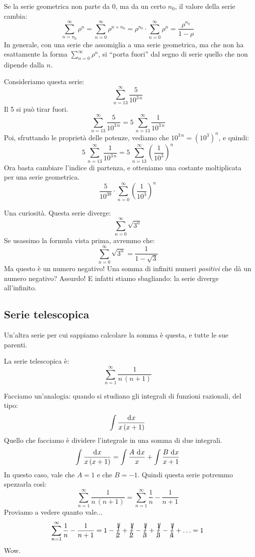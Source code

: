 Se la serie geometrica non parte da 0, ma da un certo $n_0$, il valore della serie cambia:
\[
\sum_{n = n_0}^{\infty} \rho^n = 
\sum_{n = 0}^{\infty} \rho^{n+n_0} =
\rho^{n_0} \cdot \sum_{n = 0}^{\infty} \rho^n = \frac{\rho^{n_0}}{1 - \rho}
\]
In generale, con una serie che assomiglia a una serie geometrica, ma che non ha esattamente la forma $\sum_{n = 0}^{\infty} \rho^n$, si ``porta fuori'' dal segno di serie quello che non dipende dalla $n$.
\begin{exmp}
Consideriamo questa serie:
\[
\sum_{n = 13}^{\infty} \frac{5}{10^{3 \, n}}
\]
Il 5 si pu\`o tirar fuori.
\[
\sum_{n = 13}^{\infty} \frac{5}{10^{3 \, n}} =
5 \, \sum_{n = 13}^{\infty} \frac{1}{10^{3 \, n}}
\]
Poi, sfruttando le propriet\`a delle potenze, vediamo che $10^{3 \, n} = {\left( 10^{3} \right)}^{n}$, e quindi:
\[
5 \, \sum_{n = 13}^{\infty} \frac{1}{10^{3 \, n}} =
5 \, \sum_{n = 13}^{\infty} {\left( \frac{1}{10^3} \right)}^{n}
\]
Ora basta cambiare l'indice di partenza, e otteniamo una costante moltiplicata per una serie geometrica.
\[
\frac{5}{10^{39}} \cdot \sum_{n = 0}^{\infty} {\left( \frac{1}{10^3} \right)}^{n}
\]
\end{exmp}
Una curiosit\`a. Questa serie diverge:
\[
\sum_{n = 0}^{\infty} \sqrt{3^n}
\]
Se usassimo la formula vista prima, avremmo che:
\[
\sum_{n = 0}^{\infty} \sqrt{3^n} =
\frac{1}{1 - \sqrt{3}}
\]
Ma questo \`e un numero negativo! Una somma di infiniti numeri \emph{positivi} che d\`a un numero negativo? Assurdo! E infatti stiamo sbagliando: la serie diverge all'infinito.

\subsection{Serie telescopica}

Un'altra serie per cui sappiamo calcolare la somma \`e questa, e tutte le sue parenti.
\begin{defn}
La serie telescopica \`e:
\[
\sum_{n = 1}^{\infty} \frac{1}{n \, (n + 1)}
\]
\end{defn}

Facciamo un'analogia: quando si studiano gli integrali di funzioni razionali, del tipo:
\[
\int \frac{\diff x}{x \, (x + 1)}
\]
Quello che facciamo \`e dividere l'integrale in una somma di due integrali.
\[
\int \frac{\diff x}{x \, (x + 1)} = \int \frac{A \dx}{x} + \int \frac{B \dx}{x + 1}
\]
In questo caso, vale che $A = 1$ e che $B = -1$. Quindi questa serie potremmo spezzarla cos\`i:
\[
\sum_{n = 1}^{\infty} \frac{1}{n \, (n + 1)} = 
\sum_{n = 1}^{\infty} \frac{1}{n} - \frac{1}{n+1}
\]
Proviamo a vedere quanto vale...
\[
\sum_{n = 1}^{\infty} \frac{1}{n} - \frac{1}{n+1} =
1 - \cancel{\frac{1}{2}} + \cancel{\frac{1}{2}} - \cancel{\frac{1}{3}} + \cancel{\frac{1}{3}} - \cancel{\frac{1}{4}} + \ldots = 1
\]
Wow.

